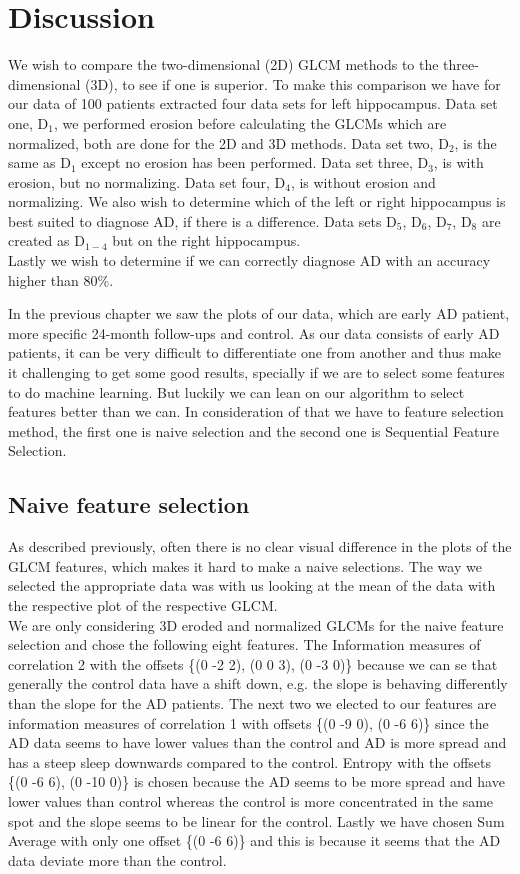 \chapter{Discussion}

We wish to compare the two-dimensional (2D) GLCM methods to the three-dimensional (3D), to see if one is superior. To make this comparison we have for our data of 100 patients extracted four data sets for left hippocampus. Data set one, D$_1$, we performed erosion before calculating the GLCMs which are normalized, both are done for the 2D and 3D methods. Data set two, D$_2$, is the same as D$_1$ except no erosion has been performed. Data set three, D$_3$, is with erosion, but no normalizing. Data set four, D$_4$, is without erosion and normalizing.
We also wish to determine which of the left or right hippocampus is best suited to diagnose AD, if there is a difference. Data sets D$_5$, D$_6$, D$_7$, D$_8$ are created as D$_{1-4}$ but on the right hippocampus.\\
Lastly we wish to determine if we can correctly diagnose AD with an accuracy higher than 80\%.

In the previous chapter we saw the plots of our data, which are early AD patient, more specific 24-month follow-ups and control. As our data consists of early AD patients, it can be very difficult to differentiate one from another and thus make it challenging to get some good results, specially if we are to select some features to do machine learning. But luckily we can lean on our algorithm to select features better than we can. In consideration of that we have to feature selection method, the first one is naive selection and the second one is Sequential Feature Selection.

\section{Naive feature selection}
As described previously, often there is no clear visual difference in the plots of the GLCM features, which makes it hard to make a naive selections. The way we selected the appropriate data was with us looking at the mean of the data with the respective plot of the respective GLCM.\\
We are only considering 3D eroded and normalized GLCMs for the naive feature selection and chose the following eight features. The Information measures of correlation 2 with the offsets \{(0 -2 2), (0 0 3), (0 -3 0)\} because we can se that generally the control data have a shift down, e.g. the slope is behaving differently than the slope for the AD patients. The next two we elected to our features are information measures of correlation 1 with offsets \{(0 -9 0), (0 -6 6)\} since the AD data seems to have lower values than the control and AD is more spread and has a steep sleep downwards compared to the control. Entropy with the offsets \{(0 -6 6), (0 -10 0)\} is chosen because the AD seems to be more spread and have lower values than control whereas the control is more concentrated in the same spot and the slope seems to be linear for the control. Lastly we have chosen Sum Average with only one offset \{(0 -6 6)\} and this is because it seems that the AD data deviate more than the control.

